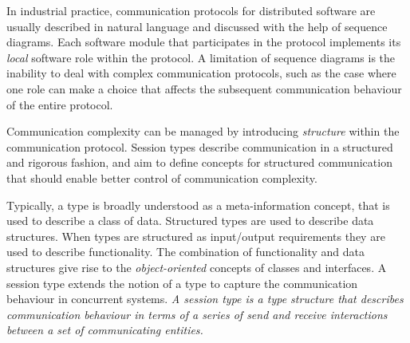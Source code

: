 In industrial practice, communication protocols for
distributed software are usually described in natural language and
discussed with the help of sequence diagrams.
Each software module that participates in the
protocol implements
its \emph{local} software role within the protocol.
A limitation of sequence diagrams is the inability to deal with complex
communication protocols, such as the case where one role
can make a choice that affects the subsequent communication behaviour
of the entire protocol.

Communication complexity can be managed by 
introducing \emph{structure} within the communication protocol.
Session types describe communication in a structured and rigorous fashion,
and aim to define concepts for structured communication
that should enable better control of communication complexity.


Typically, a type is broadly understood
as a meta-information concept, that is used to describe a class of data.
Structured types are used to describe data structures.
When types are structured as input/output requirements they
are used to describe functionality.
The combination of functionality and data structures give rise
to the \emph{object-oriented} concepts of classes and interfaces. %
%
A session type extends %
the notion of a type to capture the communication behaviour in concurrent systems.
{\em A session type is a type structure that describes communication
	behaviour in terms of a series of send and receive %
	interactions between a set of communicating entities.}  %


